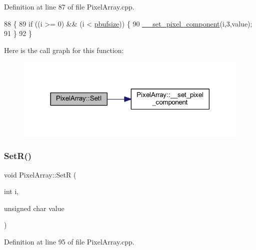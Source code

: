 Definition at line 87 of file Pixel\+Array.\+cpp.


\begin{DoxyCode}
88 \{
89     \textcolor{keywordflow}{if} ((i >= 0) && (i < \hyperlink{class_pixel_array_aca29e70f9b643bff3733ab2e694439a1}{pbufsize})) \{
90         \hyperlink{class_pixel_array_a42c6681bf771332826ecc9ad2a8cea02}{\_\_set\_pixel\_component}(i,3,value);
91     \}
92 \}
\end{DoxyCode}
Here is the call graph for this function\+:\nopagebreak
\begin{figure}[H]
\begin{center}
\leavevmode
\includegraphics[width=318pt]{class_pixel_array_afbfac74c674f63d793d85141d3a3b046_cgraph}
\end{center}
\end{figure}
\mbox{\label{class_pixel_array_abd4253e7c76f3775f31e09dfe318e3a5}} 
\subsubsection{\texorpdfstring{Set\+R()}{SetR()}}
{\footnotesize\ttfamily void Pixel\+Array\+::\+SetR (\begin{DoxyParamCaption}\item[{int}]{i,  }\item[{unsigned char}]{value }\end{DoxyParamCaption})}



Definition at line 95 of file Pixel\+Array.\+cpp.


